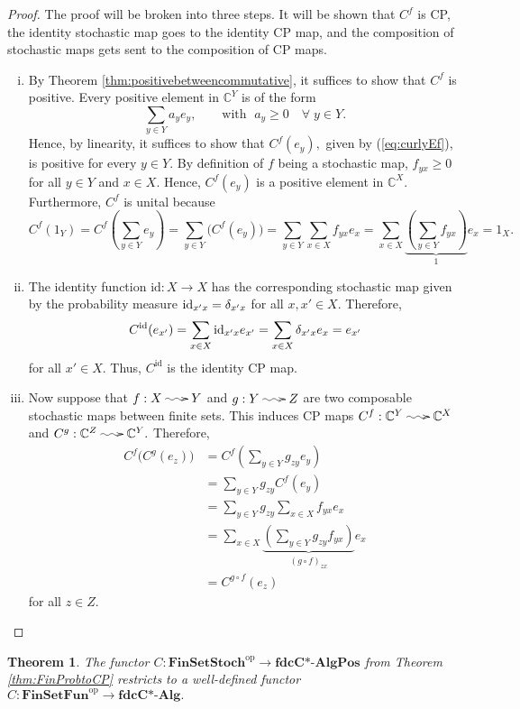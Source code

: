 \documentclass[12pt]{article}
\makeatletter
\theoremstyle{theorem}
\newtheorem{theorem}[equation]{Theorem}
\theoremstyle{definition}
\numberwithin{equation}{section}
\let\C=\Chi \let\W=\Omega
\newcommand{\be}{\begin{equation}}
\newcommand{\ee}{\end{equation}}
\newcommand{\bt}{\begin{theorem}}
\newcommand{\et}{\end{theorem}}
\newcommand{\bprf}{\begin{proof}}
\newcommand{\eprf}{\end{proof}}
\newcommand{\<}{\langle}
\renewcommand{\>}{\rangle}
\newcommand{\id}{\mathrm{id}}
\def\C{{{\mathbb C}}}
\newcommand{\fdcCAlg}{\mathbf{fdcC\text{*-}Alg}}
\newcommand{\fdcCAlgPos}{\mathbf{fdcC\text{*-}AlgPos}}
\newcommand{\FinSetFun}{\mathbf{FinSetFun}}
\newcommand{\FinSetStoch}{\mathbf{FinSetStoch}}
\newcommand{\op}{\mathrm{op}}
\newcommand{\stoch}{\;\xy0;/r.25pc/:\ar@{~>}(3,0);(-3,0);\endxy\;}
\makeatother
\begin{document}
\bprf
The proof will be broken into three steps.
It will be shown that 
$C^{f}$ is CP,
the identity stochastic map goes to the identity CP map, 
and the composition of stochastic maps gets sent
to the composition of CP maps. 
\begin{enumerate}[i.]
\item
By Theorem \ref{thm:positivebetweencommutative}, 
it suffices to show that $C^{f}$ is positive. 
Every positive element in $\C^{Y}$ is of the form 
\be
\sum_{y\in Y}a_{y}e_{y},\qquad\text{with }\;a_{y}\ge0\quad\forall\;y\in Y.
\ee
Hence, by linearity, it suffices to show that $C^{f}(e_{y}),$
given by (\ref{eq:curlyEf}), 
is positive for every $y\in Y.$ By definition of $f$ being a stochastic
map, $f_{yx}\ge0$ for all $y\in Y$ and $x\in X.$ Hence, 
$C^{f}(e_{y})$ is a positive element in $\C^{X}.$
Furthermore, $C^{f}$ is unital because
\be
C^{f}(1_{Y})=C^{f}\left(\sum_{y\in Y}e_{y}\right)
=\sum_{y\in Y}\big(C^{f}(e_{y})\big)
=\sum_{y\in Y}\sum_{x\in X}f_{yx}e_{x}
=\sum_{x\in X}\underbrace{\left(\sum_{y\in Y}f_{yx}\right)}_{1}e_{x}
=1_{X}.
\ee

\item
The identity function $\id:X\to X$ has the corresponding stochastic map
given by the probability measure $\id_{x'x}=\de_{x'x}$ for all $x,x'\in X.$ 
Therefore, 
\be
C^{\id}(e_{x'})=\sum_{x\in X}\id_{x'x}e_{x'}
=\sum_{x\in X}\de_{x'x}e_{x}
=e_{x'}
\ee
for all $x'\in X.$ Thus, $C^{\id}$ is the identity CP map.

\item
Now suppose that $f:X\stoch Y$ and $g:Y\stoch Z$ are two
composable stochastic maps between finite sets.
This induces CP maps 
$C^{f}:\C^{Y}\stoch\C^{X}$
and $C^{g}:\C^{Z}\stoch\C^{Y}.$
Therefore, 
\be
\label{eq:Ccofunctoriality}
\begin{split}
C^{f}\big(C^{g}(e_{z})\big)
&=C^{f}\left(\sum_{y\in Y}g_{zy}e_{y}\right)\\
&=\sum_{y\in Y}g_{zy}C^{f}(e_{y})\\
&=\sum_{y\in Y}g_{zy}\sum_{x\in X}f_{yx}e_{x}\\
&=\sum_{x\in X}\underbrace{\left(\sum_{y\in Y}g_{zy}f_{yx}\right)}_{(g\circ f)_{zx}}e_{x}\\
&=C^{g\circ f}(e_{z})
\end{split}
\ee
for all $z\in Z.$ 
\end{enumerate} 
\eprf

\bt
\label{thm:restrictEtofinprob}
The functor $C:\FinSetStoch^{\op}\to\fdcCAlgPos$ from Theorem 
\ref{thm:FinProbtoCP} restricts to
a well-defined functor $C:\FinSetFun^{\op}\to\fdcCAlg.$ 
\et
\end{document}
